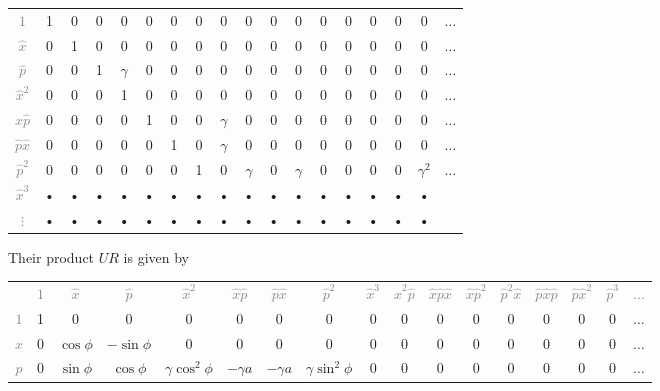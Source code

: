 \documentclass[aps,pra,10pt,onecolumn,notitlepage, groupedaddress,nofootinbib]{revtex4-1}
\theoremstyle{plain}
\begin{document}
{\begin{center}
\begin{tabular}{cccccccccccccccccc}
\textcolor{gray}{$1$} & 1 & 0 & 0 & 0 & 0 & 0 & 0 & 0 & 0 & 0 & 0 & 0 & 0& 0 & 0 & 0 & $\hdots$ \\ 
\textcolor{gray}{$\hat{x}$}  & 0 & 1 & 0 & 0 & 0 & 0 & 0 & 0 & 0 & 0 & 0 & 0& 0 & 0 & 0 & 0 & $\hdots$\\ 
\textcolor{gray}{$\hat{p}$}  & 0 & 0 & 1 & $\gamma$ & 0 & 0 & 0 & 0 & 0 & 0& 0 & 0 & 0 & 0 & 0 & 0 & $\hdots$\\ 
\textcolor{gray}{$\hat{x}^2$}  & 0 & 0 & 0 & 1 & 0 & 0 & 0 & 0 & 0 & 0 & 0 & 0& 0 & 0 & 0 & 0 & $\hdots$\\ 
\textcolor{gray}{$\hat{x}\hat{p}$}  & 0 & 0 & 0 & 0 & 1 & 0 & 0 & $\gamma$ & 0 & 0 & 0 & 0& 0 & 0 & 0 & 0 & $\hdots$\\ 
\textcolor{gray}{$\hat{p}\hat{x}$}  & 0 & 0 & 0 & 0 & 0 & 1 & 0 & $\gamma$ & 0 & 0 & 0 & 0& 0 & 0 & 0 & 0 & $\hdots$\\ 
\textcolor{gray}{$\hat{p}^2$}  & 0 & 0 & 0 & 0 & 0 & 0 & 1 & 0 & $\gamma$ & 0 & $\gamma$ & 0 & 0 & 0 & 0 & $\gamma^2$ & $\hdots$\\ 
\textcolor{gray}{$\hat{x}^3$} & • & • & • & • & • & • & • & • & • & • & • & • & • & •& • & • \\ 
\textcolor{gray}{$\vdots$} & • & • & • & • & • & • & • & • & • & • & • & • & • & • & •& • \\ 
\end{tabular}   
\end{center}  
Their product $UR$ is given by
\begin{center}
\def\arraystretch{1.5}
\footnotesize
\begin{tabular}{ccccccccccccccccc}
& \textcolor{gray}{$1$} & \textcolor{gray}{$\hat{x}$} & \textcolor{gray}{$\hat{p}$} & \textcolor{gray}{$\hat{x}^2$} & \textcolor{gray}{$\hat{x}\hat{p}$} & \textcolor{gray}{$\hat{p}\hat{x}$} & \textcolor{gray}{$\hat{p}^2$} & \textcolor{gray}{$\hat{x}^3$} & \textcolor{gray}{$\hat{x}^2\hat{p}$} & \textcolor{gray}{$\hat{x}\hat{p}\hat{x}$} & \textcolor{gray}{$\hat{x}\hat{p}^2$} &  \textcolor{gray}{$\hat{p}^2\hat{x}$} &  \textcolor{gray}{$\hat{p}\hat{x}\hat{p}$} &  \textcolor{gray}{$\hat{p}\hat{x}^2$} &  \textcolor{gray}{$\hat{p}^3$}  & \textcolor{gray}{$\hdots$} \\  
\textcolor{gray}{$1$} & 1 & 0 & 0 & 0 & 0 & 0 & 0 & 0 & 0 & 0 & 0 & 0 & 0& 0 & 0 &  $\hdots$ \\ 
\textcolor{gray}{$\hat{x}$}  & 0 & $\cos \phi$ & $-\sin \phi$ & 0 & 0 & 0 & 0 & 0 & 0 & 0 & 0 & 0 & 0 & 0  & 0 & $\hdots$\\ 
\textcolor{gray}{$\hat{p}$}  & 0 & $\sin \phi$ & $ \cos \phi$ & $\gamma \cos^2 \phi$ & $-\gamma a$ & $-\gamma a$  & $\gamma\sin^2 \phi$ & 0 & 0 & 0 & 0 & 0 & 0 & 0 & 0 &  $\hdots$\\ 

\end{tabular}
\end{center}}
\end{document}
